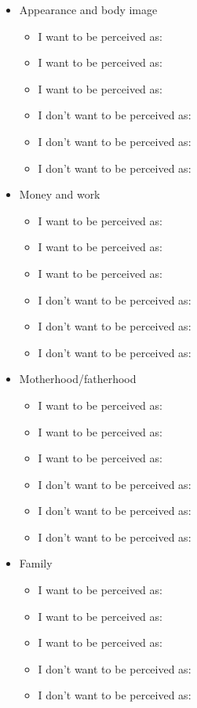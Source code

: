\documentclass[12pt,letterpaper]{article}
\begin{document}
\begin{itemize}
    \item Appearance and body image
    \begin{itemize}
        \item I want to be perceived as:
        \item I want to be perceived as:
        \item I want to be perceived as:
        \item I don't want to be perceived as:
        \item I don't want to be perceived as:
        \item I don't want to be perceived as:
    \end{itemize}
    \item Money and work
    \begin{itemize}
        \item I want to be perceived as:
        \item I want to be perceived as:
        \item I want to be perceived as:
        \item I don't want to be perceived as:
        \item I don't want to be perceived as:
        \item I don't want to be perceived as:
    \end{itemize}
    \item Motherhood/fatherhood
    \begin{itemize}
        \item I want to be perceived as:
        \item I want to be perceived as:
        \item I want to be perceived as:
        \item I don't want to be perceived as:
        \item I don't want to be perceived as:
        \item I don't want to be perceived as:
    \end{itemize}
    \item Family
    \begin{itemize}
        \item I want to be perceived as:
        \item I want to be perceived as:
        \item I want to be perceived as:
        \item I don't want to be perceived as:
        \item I don't want to be perceived as:

\end{itemize}
\end{itemize}
\end{document}

